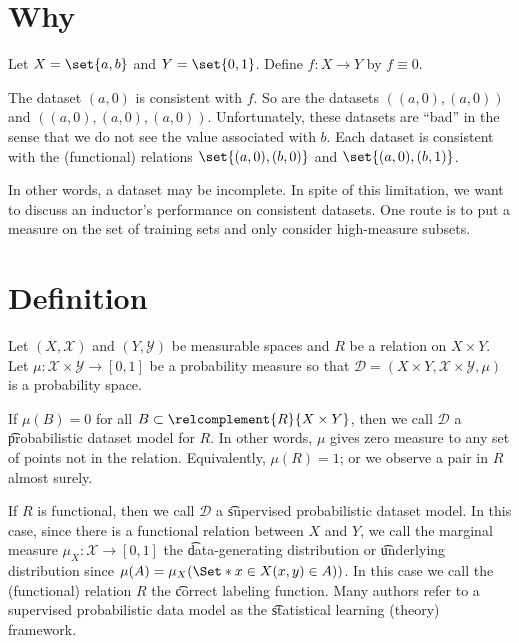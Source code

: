 

\section*{Why}

Let $X = \set{a, b}$ and $Y = \set{0, 1}$. Define $f: X \to Y$ by $f \equiv 0$.

The dataset $(a, 0)$ is consistent with $f$.
So are the datasets $((a, 0), (a, 0))$ and $((a, 0), (a, 0), (a, 0))$.
Unfortunately, these datasets are ``bad'' in the sense that we do not see the value associated with $b$.
Each dataset is consistent with the (functional) relations $\set{(a, 0), (b, 0)}$ and $\set{(a, 0), (b, 1)}$.

In other words, a dataset may be incomplete.
In spite of this limitation, we want to discuss an inductor's performance on consistent datasets.
One route is to put a measure on the set of training sets and only consider high-measure subsets.


\section*{Definition}

Let $(X, \mathcal{X} )$ and $(Y, \mathcal{Y} )$ be measurable spaces and $R$ be a relation on $X \times  Y$.
Let $\mu : \mathcal{X}  \times  \mathcal{Y}  \to [0, 1]$ be a probability measure so that $\mathcal{D}  = (X \times  Y, \mathcal{X}  \times  \mathcal{Y} , \mu )$ is a probability space.

If $\mu (B) = 0$ for all $B \subset \relcomplement{R}{X \times Y}$, then we call $\mathcal{D} $ a \t{probabilistic dataset model} for $R$.
In other words, $\mu $ gives zero measure to any set of points not in the relation.
Equivalently, $\mu (R) = 1$; or we observe a pair in $R$ almost surely.

If $R$ is functional, then we call $\mathcal{D} $ a \t{supervised probabilistic dataset model}.
In this case, since there is a functional relation between $X$ and $Y$, we call the marginal measure $\mu _X: \mathcal{X}  \to [0, 1]$ the \t{data-generating distribution} or \t{underlying distribution} since $\mu (A) = \mu _X(\Set*{x \in X}{(x, y) \in A)})$.
In this case we call the (functional) relation $R$ the \t{correct labeling function}.
Many authors refer to a supervised probabilistic data model as the \t{statistical learning (theory) framework}.

